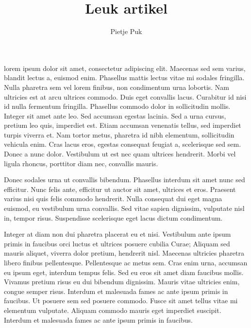 \documentclass{vakidioot}
\title {Leuk artikel}
\author{Pietje Puk}
\begin{document}
	
	
	\maketitle
	
	\begin{multicols}{2}
		\aesnaam lorem ipsum dolor sit amet, consectetur adipiscing elit. Maecenas sed sem varius, blandit lectus a, euismod enim. Phasellus mattis lectus vitae mi sodales fringilla. Nulla pharetra sem vel lorem finibus, non condimentum urna lobortis. Nam ultricies est at arcu ultrices commodo. Duis eget convallis lacus. Curabitur id nisi id nulla fermentum fringilla. Phasellus commodo dolor in sollicitudin mollis. Integer sit amet ante leo. Sed accumsan egestas lacinia. Sed a urna cursus, pretium leo quis, imperdiet est. Etiam accumsan venenatis tellus, sed imperdiet turpis viverra et. Nam tortor metus, pharetra id nibh elementum, sollicitudin vehicula enim. Cras lacus eros, egestas consequat feugiat a, scelerisque sed sem. Donec a nunc dolor. Vestibulum ut est nec quam ultrices hendrerit. Morbi vel ligula rhoncus, porttitor diam nec, convallis mauris.
		
		Donec sodales urna ut convallis bibendum. Phasellus interdum sit amet nunc sed efficitur. Nunc felis ante, efficitur ut auctor sit amet, ultrices et eros. Praesent varius nisi quis felis commodo hendrerit. Nulla consequat dui eget magna euismod, eu vestibulum urna convallis. Sed vitae sapien dignissim, vulputate nisl in, tempor risus. Suspendisse scelerisque eget lacus dictum condimentum.
		
		Integer at diam non dui pharetra placerat eu et nisi. Vestibulum ante ipsum primis in faucibus orci luctus et ultrices posuere cubilia Curae; Aliquam sed mauris aliquet, viverra dolor pretium, hendrerit nisl. Maecenas ultricies pharetra libero finibus pellentesque. Pellentesque ac metus sem. Cras enim urna, accumsan eu ipsum eget, interdum tempus felis. Sed eu eros sit amet diam faucibus mollis. Vivamus pretium risus eu dui bibendum dignissim. Mauris vitae ultricies enim, congue semper risus. Interdum et malesuada fames ac ante ipsum primis in faucibus. Ut posuere sem sed posuere commodo. Fusce sit amet tellus vitae mi elementum vulputate. Aliquam commodo mauris eget imperdiet suscipit. Interdum et malesuada fames ac ante ipsum primis in faucibus.
	\end{multicols}
 
\end{document}
